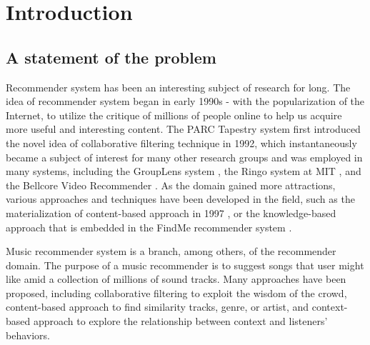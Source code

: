 
\chapter{Introduction} %

\label{Chapter1} %


\newcommand{\keyword}[1]{\textbf{#1}}
\newcommand{\tabhead}[1]{\textbf{#1}}
\newcommand{\code}[1]{\texttt{#1}}
\newcommand{\file}[1]{\texttt{\bfseries#1}}
\newcommand{\option}[1]{\texttt{\itshape#1}}


\section{A statement of the problem}
Recommender system has been an interesting subject of research for long. The idea of recommender system began in early 1990s - with the popularization of the Internet, to utilize the critique of millions of people online to help us acquire more useful and interesting content. The PARC Tapestry system \cite{goldberg1992using} first introduced the novel idea of collaborative filtering technique in 1992, which instantaneously became a subject of interest for many other research groups and was employed in many systems, including the GroupLens system \cite{resnick1994open}, the Ringo system at MIT \cite{shardanand1995social}, and the Bellcore Video Recommender \cite{hill1995recommending}. As the domain gained more attractions, various approaches and techniques have been developed in the field, such as the materialization of content-based approach in 1997 \cite{balabanovic1997content}, or the knowledge-based approach that is embedded in the FindMe recommender system \cite{trewin2000knowledge}. 

Music recommender system is a branch, among others, of the recommender domain. The purpose of a music recommender is to suggest songs that user might like amid a collection of millions of sound tracks. Many approaches have been proposed, including collaborative filtering to exploit the wisdom of the crowd, content-based approach to find similarity tracks, genre, or artist, and context-based approach to explore the relationship between context and listeners' behaviors. 


